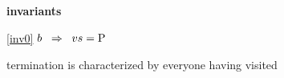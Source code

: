 \textbf{invariants}
\begin{block}
\item[ \eqref{inv0} ]$b \; \; \Rightarrow \; \; vs = \text{P}$ %
  \item   \begin{block}
    \item    termination is characterized by everyone 
    	having visited 
  \end{block}
\end{block}
